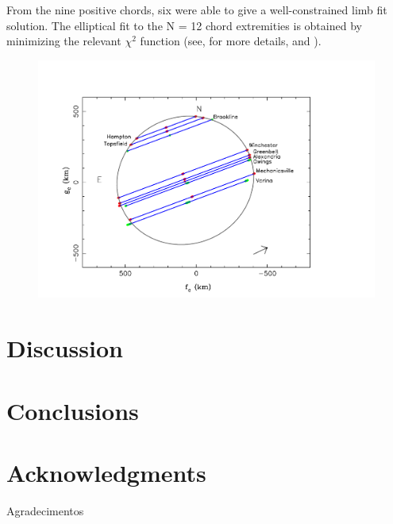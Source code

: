 \documentclass[useAMS,usenatbib]{mn2e}
\begin{document}
From the nine positive chords, six were able to give a well-constrained limb fit solution. The elliptical fit to the N = 12
chord extremities is obtained by minimizing the relevant $\chi^{2}$ function (see, for more details, \cite{Sicardy2011} and \cite{BragaRibas2013}).





\begin{figure}
\includegraphics[scale=0.36]{figures/Ceres_2013_body.pdf}
\caption{\label{Fig: Ceres-2013-body}}
\end{figure}

\section[]{Discussion}






\section{Conclusions}



\section*{Acknowledgments}

Agradecimentos
\end{document}
